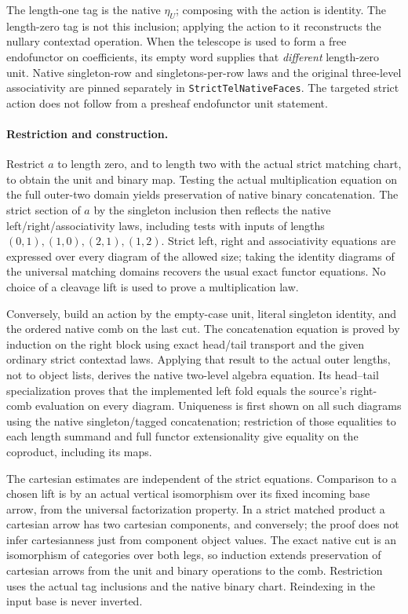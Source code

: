\documentclass[11pt]{article}
\begin{document}
The length-one tag is the native \(\eta_U\); composing with the action is identity. The length-zero tag is not this inclusion; applying the action to it reconstructs the nullary contextad operation. When the telescope is used to form a free endofunctor on coefficients, its empty word supplies that \emph{different} length-zero unit. Native singleton-row and singletons-per-row laws and the original three-level associativity are pinned separately in \verb|StrictTelNativeFaces|. The targeted strict action does not follow from a presheaf endofunctor unit statement.

\paragraph{Restriction and construction.}
Restrict \(a\) to length zero, and to length two with the actual strict matching chart, to obtain the unit and binary map. Testing the actual multiplication equation on the full outer-two domain yields preservation of native binary concatenation. The strict section of \(a\) by the singleton inclusion then reflects the native left/right/associativity laws, including tests with inputs of lengths \((0,1),(1,0),(2,1),(1,2)\). Strict left, right and associativity equations are expressed over every diagram of the allowed size; taking the identity diagrams of the universal matching domains recovers the usual exact functor equations. No choice of a cleavage lift is used to prove a multiplication law.

Conversely, build an action by the empty-case unit, literal singleton identity, and the ordered native comb on the last cut. The concatenation equation is proved by induction on the right block using exact head/tail transport and the given ordinary strict contextad laws. Applying that result to the actual outer lengths, not to object lists, derives the native two-level algebra equation. Its head--tail specialization proves that the implemented left fold equals the source's right-comb evaluation on every diagram. Uniqueness is first shown on all such diagrams using the native singleton/tagged concatenation; restriction of those equalities to each length summand and full functor extensionality give equality on the coproduct, including its maps.

The cartesian estimates are independent of the strict equations. Comparison to a chosen lift is by an actual vertical isomorphism over its fixed incoming base arrow, from the universal factorization property. In a strict matched product a cartesian arrow has two cartesian components, and conversely; the proof does not infer cartesianness just from component object values. The exact native cut is an isomorphism of categories over both legs, so induction extends preservation of cartesian arrows from the unit and binary operations to the comb. Restriction uses the actual tag inclusions and the native binary chart. Reindexing in the input base is never inverted.
\end{document}
